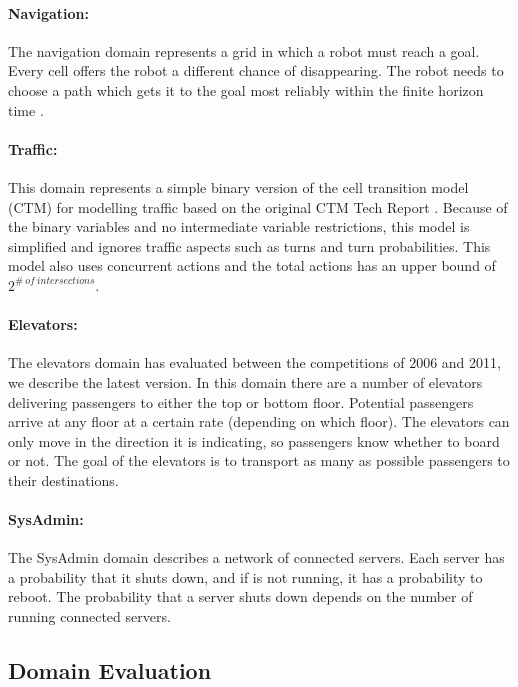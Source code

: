\documentclass[runningheads,a4paper]{llncs}
\begin{document}
\paragraph{Navigation:}
The navigation domain represents a grid in which a robot must reach a goal.
Every cell offers the robot a different chance of disappearing. The robot needs
to choose a path which gets it to the goal most reliably within the finite
horizon time \cite{sanner2011navigation}.

\paragraph{Traffic:}
This domain represents a simple binary version of the cell transition model
(CTM) for modelling traffic based on the original CTM Tech Report
\cite{sanner2011traffic}. Because of the binary variables and no intermediate
variable restrictions, this model is simplified and ignores traffic aspects
such as turns and turn probabilities. This model also uses concurrent actions
and the total actions has an upper bound of $2^{\#~of~intersections}$.

\paragraph{Elevators:}
The elevators domain has evaluated between the competitions of 2006 and
2011, we describe the latest version. In this domain there are a number of
elevators delivering passengers to either the top or bottom floor. Potential
passengers arrive at any floor at a certain rate (depending on which floor).
The elevators can only move in the direction it is indicating, so passengers
know whether to board or not. The goal of the elevators is to transport as many
as possible passengers to their destinations.

\paragraph{SysAdmin:}
The SysAdmin domain describes a network of connected servers. Each server has
a probability that it shuts down, and if is not running, it has a probability
to reboot. The probability that a server shuts down depends on the number of
running connected servers.

\subsection{Domain Evaluation}
\end{document}
